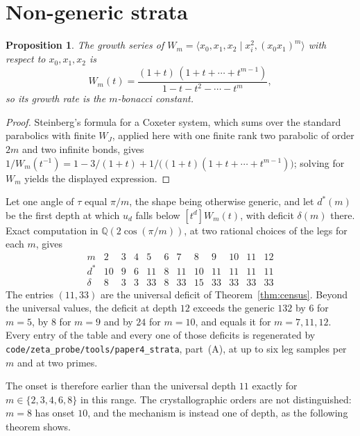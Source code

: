 \documentclass[11pt]{article}
\newtheorem{proposition}[theorem]{Proposition}
\theoremstyle{definition}
\theoremstyle{remark}
\newcommand{\Q}{\mathbb{Q}}
\begin{document}
\section{Non-generic strata}\label{sec:strata}

\begin{proposition}\label{prop:coxeter}
The growth series of $W_m=\langle x_0,x_1,x_2\mid x_i^2,(x_0x_1)^m\rangle$ with
respect to $x_0,x_1,x_2$ is
\[
  W_m(t)=\frac{(1+t)\,(1+t+\cdots+t^{m-1})}{1-t-t^2-\cdots-t^m},
\]
so its growth rate is the $m$-bonacci constant.
\end{proposition}

\begin{proof}
Steinberg's formula \cite{Steinberg,Bourbaki} for a Coxeter system, which sums
over the standard parabolics with finite $W_J$, applied here with one finite
rank two parabolic of order $2m$ and two infinite bonds, gives
$1/W_m(t^{-1})=1-3/(1+t)+1/\bigl((1+t)(1+t+\cdots+t^{m-1})\bigr)$; solving for
$W_m$ yields the displayed expression.
\end{proof}

Let one angle of $\tau$ equal $\pi/m$, the shape being otherwise generic, and
let $d^*(m)$ be the first depth at which $u_d$ falls below $[t^d]W_m(t)$, with
deficit $\delta(m)$ there. Exact computation in $\Q(2\cos(\pi/m))$, at two
rational choices of the legs for each $m$, gives
\[
\begin{array}{r|rrrrrrrrrrr}
 m & 2 & 3 & 4 & 5 & 6 & 7 & 8 & 9 & 10 & 11 & 12\\\hline
 d^* & 10 & 9 & 6 & 11 & 8 & 11 & 10 & 11 & 11 & 11 & 11\\
 \delta & 8 & 3 & 3 & 33 & 8 & 33 & 15 & 33 & 33 & 33 & 33
\end{array}
\]
The entries $(11,33)$ are the universal deficit of Theorem~\ref{thm:census}.
Beyond the universal values, the deficit at depth $12$ exceeds the generic
$132$ by $6$ for $m=5$, by $8$ for $m=9$ and by $24$ for $m=10$, and equals it
for $m=7,11,12$. Every entry of the table and every one of those deficits is
regenerated by \texttt{code/zeta\_probe/tools/paper4\_strata}, part~(A), at up
to six leg samples per $m$ and at two primes.

The onset is therefore earlier than the universal depth $11$ exactly for
$m\in\{2,3,4,6,8\}$ in this range. The crystallographic orders are not
distinguished: $m=8$ has onset $10$, and the mechanism is instead one of
depth, as the following theorem shows.
\end{document}
